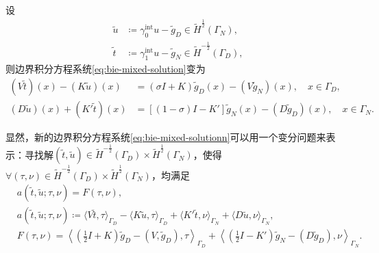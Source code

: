 设
\begin{equation*}
  \begin{split}
    \widetilde{u} & \coloneqq \gamma_{0}^{\text{int}} u - \widetilde{g}_{D} \in \widetilde{H}^{\frac{1}{2}}(\Gamma_{N}), \\
    \widetilde{t} & \coloneqq \gamma_{1}^{\text{int}} u -
    \widetilde{g}_{N} \in \widetilde{H}^{-\frac{1}{2}}(\Gamma_{D}),
  \end{split}
\end{equation*}
则边界积分方程系统\eqref{eq:bie-mixed-solution}变为
\begin{equation}
  \label{eq:bie-mixed-solutionn}
  \begin{split}
    \left(V \widetilde{t} \right)(x)
    - \left(K \widetilde{u} \right)(x)
    & =
    \left( \sigma I + K \right) \widetilde{g}_{D}(x)
    - \left( V \widetilde{g}_{N} \right)(x), \quad x \in \Gamma_{D}, \\
    \left( D \widetilde{u} \right)(x)
    + \left( K' \widetilde{t} \right)(x)
    & =
    \left[ \left( 1 - \sigma \right) I - K' \right]
    \widetilde{g}_{N}(x)
    - \left( D \widetilde{g}_{D} \right)(x), \quad x \in \Gamma_{N}.
  \end{split}
\end{equation}

显然，新的边界积分方程系统\eqref{eq:bie-mixed-solutionn}可以用一个变分问题来表示：寻找解$\left( \widetilde{t}, \widetilde{u} \right) \in \widetilde{H}^{-\frac{1}{2}}(\Gamma_{D}) \times \widetilde{H}^{\frac{1}{2}}(\Gamma_{N})$，使得$\forall \left( \tau, \nu \right) \in \widetilde{H}^{-\frac{1}{2}}(\Gamma_{D}) \times \widetilde{H}^{\frac{1}{2}}(\Gamma_{N})$，均满足
\begin{equation}
  \label{eq:bie-mixed-varitional}
  \begin{split}
    &a (\widetilde{t}, \widetilde{u} ; \tau, \nu ) = F(\tau, \nu),\\
    &a ( \widetilde{t}, \widetilde{u} ; \tau, \nu )
    \coloneqq \langle V \widetilde{t}, \tau \rangle_{\Gamma_{D}}
    - \langle K \widetilde{u}, \tau \rangle_{\Gamma_{D}}
    + \langle K' \widetilde{t}, \nu \rangle_{\Gamma_{N}}
    + \langle D \widetilde{u}, \nu \rangle_{\Gamma_{N}}, \\
    & F(\tau, \nu) =
    \left\langle
    \left( \frac{1}{2} I + K \right) \widetilde{g}_{D}
    - \left(V, \widetilde{g}_{D} \right), \tau
    \right\rangle_{\Gamma_{D}}
    + \left\langle
    \left(\frac{1}{2} I - K' \right) \widetilde{g}_{N}
    - \left( D \widetilde{g}_{D} \right), \nu
    \right\rangle_{\Gamma_{N}}.
  \end{split}
\end{equation}


